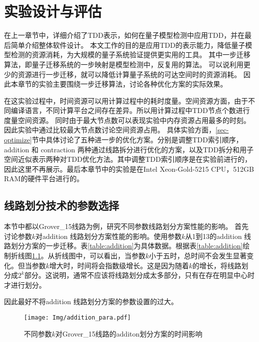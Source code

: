 \chapter{实验设计与评估}
\label{sec-ex}
在上一章节中，详细介绍了TDD表示，如何在量子模型检测中应用TDD，并在最后简单介绍整体软件设计。
本文工作的目的是应用TDD的表示能力，降低量子模型检测的资源消耗，为大规模的量子系统验证提供更实用的工具。
其中一步迁移算法，即量子迁移系统的一步映射是模型检测中，反复用的算法。
可以说利用更少的资源进行一步迁移，就可以降低计算量子系统的可达空间时的资源消耗。
因此本章节的实验主要围绕一步迁移算法，讨论各种优化方案的实际效果。

在这实验过程中，时间资源可以用计算过程中的耗时度量。空间资源方面，由于不同编译语言，不同计算平台之间存在差异。所以用计算过程中TDD节点个数进行度量空间资源。
同时由于最大节点数可以表现实验中内存资源占用最多的时刻。因此实验中通过比较最大节点数讨论空间资源占用。
具体实验方面，\ref{sec-optimize}节中具体讨论了五种进一步的优化方案。分别是调整TDD索引顺序，addition 和 contraction 两种通过线路拆分进行优化的方案，以及TDD拆分和用子空间近似表示两种对TDD优化方法。其中调整TDD索引顺序是在实验前进行的，因此这里不再展示。最后本章节中的实验是在Intel Xeon-Gold-5215 CPU，512GB RAM的硬件平台进行的。
\section{线路划分技术的参数选择}
\label{sec-para}
本节中都以Grover\_15线路为例，研究不同参数线路划分方案性能的影响。
首先讨论参数$k$对addition 线路划分方案性能的影响。使用参数$k$从1到13的addition 线路划分方案的一步迁移。表\ref{table:addition}为具体数据。根据表\ref{table:addition}绘制折线图\ref{fig:addition-ex}。从折线图中，可以看出，当参数$k$小于五时，总时间不会发生显著变化。但当参数$k$增大时，时间将会指数级增长。这是因为随着$k$的增长，将线路划分成$2^k$部分。这说明，通常不应该将线路划分成太多部分，只有在存在明显中心时才进行划分。

因此最好不将addition 线路划分方案的参数设置的过大。
\begin{figure}
    \centering
    \texttt{[image: Img/addition\_para.pdf]}
    \caption{不同参数$k$对Grover\_15线路的additon划分方案的时间影响}
    \label{fig:addition-ex}
\end{figure}
\begin{table}[htbp]
    \centering
    \caption{对grover\_15应用不同的addition参数的时间对比}
    \label{table:addition}
\end{table}



